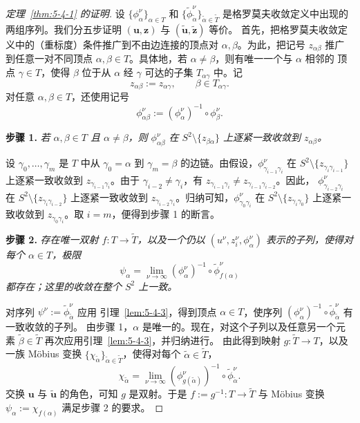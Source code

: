 \begin{proof}[定理~\ref{thm:5-4-1} 的证明]
设 $\{\phi_\alpha^\nu\}_{\alpha\in T}$ 和
$\{\widetilde\phi_{\widetilde\alpha}^\nu\}_{\widetilde\alpha\in\widetilde T}$
是格罗莫夫收敛定义中出现的两组序列。我们分五步证明
$(\mathbf u,\mathbf z)$ 与 $(\widetilde{\mathbf u},\widetilde{\mathbf z})$ 等价。
首先，把格罗莫夫收敛定义中的（重标度）条件推广到不由边连接的顶点对
$\alpha,\beta$。为此，把记号 $z_{\alpha\beta}$ 推广到任意一对不同顶点
$\alpha,\beta\in T$。具体地，若 $\alpha\ne\beta$，则有唯一一个与 $\alpha$ 相邻的
顶点 $\gamma\in T$，使得 $\beta$ 位于从 $\alpha$ 经 $\gamma$ 可达的子集
$T_{\alpha\gamma}$ 中。记
\[
  z_{\alpha\beta}:=z_{\alpha\gamma},
  \qquad \beta\in T_{\alpha\gamma}.
\]
对任意 $\alpha,\beta\in T$，还使用记号
\[
  \phi_{\alpha\beta}^\nu
  :=(\phi_\alpha^\nu)^{-1}\circ\phi_\beta^\nu.
\]

\medskip
\noindent\textbf{步骤 1.}\quad
\emph{若 $\alpha,\beta\in T$ 且 $\alpha\ne\beta$，则
$\phi_{\alpha\beta}^\nu$ 在 $S^2\setminus\{z_{\beta\alpha}\}$ 上逐紧一致收敛到
$z_{\alpha\beta}$。}

设 $\gamma_0,\ldots,\gamma_m$ 是 $T$ 中从 $\gamma_0=\alpha$ 到
$\gamma_m=\beta$ 的边链。由假设，$\phi_{\gamma_{i-1}\gamma_i}^\nu$ 在
$S^2\setminus\{z_{\gamma_i\gamma_{i-1}}\}$ 上逐紧一致收敛到
$z_{\gamma_{i-1}\gamma_i}$。由于 $\gamma_{i-2}\ne\gamma_i$，有
$z_{\gamma_{i-1}\gamma_i}\ne z_{\gamma_{i-1}\gamma_{i-2}}$。因此，
$\phi_{\gamma_{i-2}\gamma_i}^\nu$ 在
$S^2\setminus\{z_{\gamma_i\gamma_{i-2}}\}$ 上逐紧一致收敛到
$z_{\gamma_{i-2}\gamma_i}$。归纳可知，$\phi_{\gamma_0\gamma_i}^\nu$ 在
$S^2\setminus\{z_{\gamma_i\gamma_0}\}$ 上逐紧一致收敛到
$z_{\gamma_0\gamma_i}$。取 $i=m$，便得到步骤 1 的断言。

\medskip
\noindent\textbf{步骤 2.}\quad
\emph{存在唯一双射 $f:T\to\widetilde T$，以及一个仍以
$(u^\nu,z_i^\nu,\phi_\alpha^\nu)$ 表示的子列，使得对每个 $\alpha\in T$，极限}
\begin{equation}\label{eq:5-4-3}
  \psi_\alpha
  =\lim_{\nu\to\infty}
  (\phi_\alpha^\nu)^{-1}\circ\widetilde\phi_{f(\alpha)}^\nu
\end{equation}
\emph{都存在；这里的收敛在整个 $S^2$ 上一致。}

对序列 $\psi^\nu:=\widetilde\phi_{\widetilde\alpha}^\nu$ 应用
引理~\ref{lem:5-4-3}，得到顶点 $\alpha\in T$，使序列
$(\phi_\alpha^\nu)^{-1}\circ\widetilde\phi_{\widetilde\alpha}^\nu$ 有一致收敛的子列。
由步骤 1，$\alpha$ 是唯一的。现在，对这个子列以及任意另一个元素
$\widetilde\beta\in\widetilde T$ 再次应用引理~\ref{lem:5-4-3}，并归纳进行。
由此得到映射 $g:\widetilde T\to T$，以及一族 Möbius 变换
$\{\chi_{\widetilde\alpha}\}_{\widetilde\alpha\in\widetilde T}$，使得对每个
$\widetilde\alpha\in\widetilde T$，
\[
  \chi_{\widetilde\alpha}
  =\lim_{\nu\to\infty}
  (\phi_{g(\widetilde\alpha)}^\nu)^{-1}
  \circ\widetilde\phi_{\widetilde\alpha}^\nu.
\]
交换 $\mathbf u$ 与 $\widetilde{\mathbf u}$ 的角色，可知 $g$ 是双射。于是
$f:=g^{-1}:T\to\widetilde T$ 与 Möbius 变换
$\psi_\alpha:=\chi_{f(\alpha)}$ 满足步骤 2 的要求。


\end{proof}
